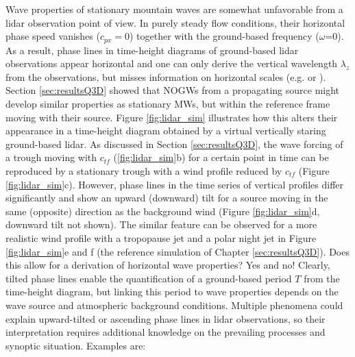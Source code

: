 Wave properties of stationary mountain waves are somewhat unfavorable from a lidar observation point of view. In purely steady flow conditions, their horizontal phase speed vanishes ($c_{px}=0$) together with the ground-based frequency ($\omega$=0). As a result, phase lines in time-height diagrams of ground-based lidar observations appear horizontal and one can only derive the vertical wavelength $\lambda_z$ from the observations, but misses information on horizontal scales (e.g. \cite[]{dornbrack_interpretation_2017} or \cite[]{reichert_highcadence_2021}). Section \ref{sec:resultsQ3D} showed that NOGWs from a propagating source might develop similar properties as stationary MWs, but within the reference frame moving with their source. Figure \ref{fig:lidar_sim} illustrates how this alters their appearance in a time-height diagram obtained by a virtual vertically staring ground-based lidar. As discussed in Section \ref{sec:resultsQ3D}, the wave forcing of a trough moving with $c_{tf}$ (\ref{fig:lidar_sim}b) for a certain point in time can be reproduced by a stationary trough with a wind profile reduced by $c_{tf}$ (Figure \ref{fig:lidar_sim}c). However, phase lines in the time series of vertical profiles differ significantly and show an upward (downward) tilt for a source moving in the same (opposite) direction as the background wind (Figure \ref{fig:lidar_sim}d, downward tilt not shown). The similar feature can be observed for a more realistic wind profile with a tropopause jet and a polar night jet in Figure \ref{fig:lidar_sim}e and f (the reference simulation of Chapter \ref{sec:resultsQ3D}). Does this allow for a derivation of horizontal wave properties? Yes and no! Clearly, tilted phase lines enable the quantification of a ground-based period $T$ from the time-height diagram, but linking this period to wave properties depends on the wave source and atmospheric background conditions. Multiple phenomena could explain upward-tilted or ascending phase lines in lidar observations, so their interpretation requires additional knowledge on the prevailing processes and synoptic situation. Examples are:

